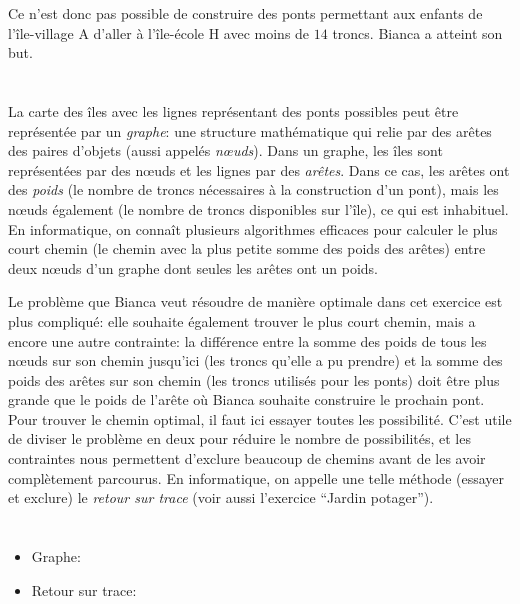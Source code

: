 {{Ce n’est donc pas possible de construire des ponts permettant aux enfants de l’île-village A d’aller à l’île-école H avec moins de $14$ troncs. Bianca a atteint son but.



\section*{\BrochureItsInformatics}
La carte des îles avec les lignes représentant des ponts possibles peut être représentée par un \emph{graphe}: une structure mathématique qui relie par des arêtes des paires d’objets (aussi appelés \emph{nœuds}). Dans un graphe, les îles sont représentées par des nœuds et les lignes par des \emph{arêtes}. Dans ce cas, les arêtes ont des \emph{poids} (le nombre de troncs nécessaires à la construction d’un pont), mais les nœuds également (le nombre de troncs disponibles sur l’île), ce qui est inhabituel. En informatique, on connaît plusieurs algorithmes efficaces pour calculer le plus court chemin (le chemin avec la plus petite somme des poids des arêtes) entre deux nœuds d’un graphe dont seules les arêtes ont un poids.

Le problème que Bianca veut résoudre de manière optimale dans cet exercice est plus compliqué: elle souhaite également trouver le plus court chemin, mais a encore une autre contrainte: la différence entre la somme des poids de tous les nœuds sur son chemin jusqu’ici (les troncs qu’elle a pu prendre) et la somme des poids des arêtes sur son chemin (les troncs utilisés pour les ponts) doit être plus grande que le poids de l’arête où Bianca souhaite construire le prochain pont. Pour trouver le chemin optimal, il faut ici essayer toutes les possibilité. C’est utile de diviser le problème en deux pour réduire le nombre de possibilités, et les contraintes nous permettent d’exclure beaucoup de chemins avant de les avoir complètement parcourus. En informatique, on appelle une telle méthode (essayer et exclure) le \emph{retour sur trace} (voir aussi l’exercice “Jardin potager”).



\section*{\BrochureWebsitesAndKeywords}
{\raggedright
\begin{itemize}
  \item Graphe: \href{https://fr.wikipedia.org/wiki/Graphe_(math\%C3\%A9matiques_discr\%C3\%A8tes)}{}
  \item Retour sur trace: \href{https://fr.wikipedia.org/wiki/Retour_sur_trace}{}
\end{itemize}


}}}
